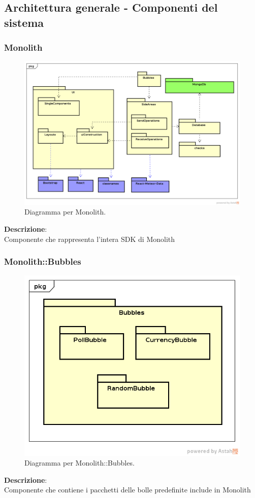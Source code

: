 \subsection{Architettura generale - Componenti del sistema}
\subsubsection{Monolith}
   \FloatBarrier
   \begin{figure}[ht]
   \centering
\includegraphics[width=\textwidth,keepaspectratio]{img/General}
   \caption{Diagramma per Monolith.}
\end{figure}
\FloatBarrier
\textbf{Descrizione}:\\
 Componente che rappresenta l'intera SDK di Monolith 


\clearpage

\subsubsection{Monolith::Bubbles}
   \FloatBarrier
   \begin{figure}[ht]
   \centering
\includegraphics[width=\textwidth,keepaspectratio]{img/Bubbles}
   \caption{Diagramma per Monolith::Bubbles.}
\end{figure}
\FloatBarrier
\textbf{Descrizione}:\\
 Componente che contiene i pacchetti delle bolle predefinite include in Monolith 


